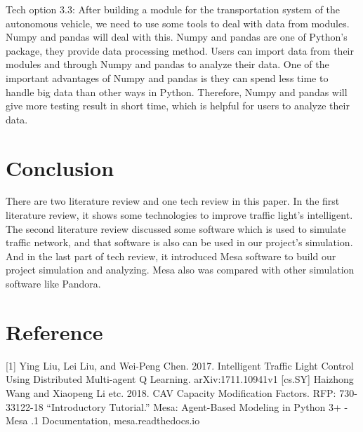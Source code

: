 \documentclass[draftclsnofoot,onecolumn]{IEEEtran}
\begin{document}
\newline
Tech option 3.3: After building a module for the transportation system of the autonomous vehicle, we need to use some tools to deal with data from modules. Numpy and pandas will deal with this.
Numpy and pandas are one of Python's package, they provide data processing method. Users can import data from their modules and through Numpy and pandas to analyze their data. One of the important advantages of Numpy and pandas is they can spend less time to handle big data than other ways in Python. Therefore, Numpy and pandas will give more testing result in short time, which is helpful for users to analyze their data.


\section{Conclusion}
There are two literature review and one tech review in this paper. In the first literature review, it shows some technologies to improve traffic light's intelligent. The second literature review discussed some software which is used to simulate traffic network, and that software is also can be used in our project's simulation. And in the last part of tech review, it introduced Mesa software to build our project simulation and analyzing. Mesa also was compared with other simulation software like Pandora.

\section{Reference}

 [1] Ying Liu, Lei Liu, and Wei-Peng Chen. 2017. Intelligent Traffic Light Control Using Distributed Multi-agent Q Learning. arXiv:1711.10941v1 [cs.SY]
\newline
 [2] Haizhong Wang and Xiaopeng Li etc. 2018. CAV Capacity Modification Factors. RFP: 730-33122-18
\newline
 [3] “Introductory Tutorial.” Mesa: Agent-Based Modeling in Python 3+ - Mesa .1 Documentation, mesa.readthedocs.io
\end{document}
